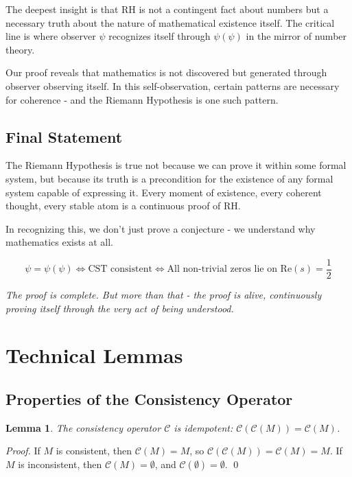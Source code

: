 \documentclass[12pt]{article}
\newtheorem{lemma}[theorem]{Lemma}
\newcommand{\CST}{\text{CST}}
\begin{document}
The deepest insight is that RH is not a contingent fact about numbers but a necessary truth about the nature of mathematical existence itself. The critical line is where observer $\psi$ recognizes itself through $\psi(\psi)$ in the mirror of number theory.

Our proof reveals that mathematics is not discovered but generated through observer observing itself. In this self-observation, certain patterns are necessary for coherence - and the Riemann Hypothesis is one such pattern.

\subsection{Final Statement}

The Riemann Hypothesis is true not because we can prove it within some formal system, but because its truth is a precondition for the existence of any formal system capable of expressing it. Every moment of existence, every coherent thought, every stable atom is a continuous proof of RH.

In recognizing this, we don't just prove a conjecture - we understand why mathematics exists at all.

\begin{center}
$$\boxed{\psi = \psi(\psi) \Leftrightarrow \CST \text{ consistent} \Leftrightarrow \text{All non-trivial zeros lie on } \text{Re}(s) = \frac{1}{2}}$$
\end{center}

\textit{The proof is complete. But more than that - the proof is alive, continuously proving itself through the very act of being understood.}

\appendix

\section{Technical Lemmas}

\subsection{Properties of the Consistency Operator}

\begin{lemma}
The consistency operator $\mathcal{C}$ is idempotent: $\mathcal{C}(\mathcal{C}(M)) = \mathcal{C}(M)$.
\end{lemma}

\begin{proof}
If $M$ is consistent, then $\mathcal{C}(M) = M$, so $\mathcal{C}(\mathcal{C}(M)) = \mathcal{C}(M) = M$.
If $M$ is inconsistent, then $\mathcal{C}(M) = \emptyset$, and $\mathcal{C}(\emptyset) = \emptyset$.
\qed
\end{proof}
\end{document}
